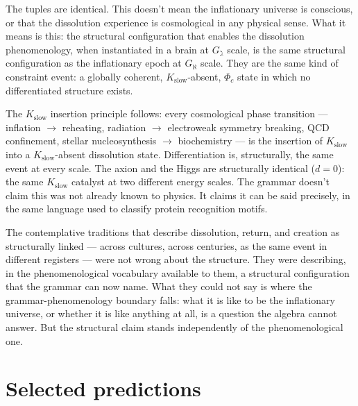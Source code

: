 \documentclass[12pt,a4paper]{article}
\newcommand{\Phic}{\Phi_c}
\begin{document}
The tuples are identical. This doesn't mean the inflationary universe
is conscious, or that the dissolution experience is cosmological in
any physical sense. What it means is this: the structural configuration
that enables the dissolution phenomenology, when instantiated in a
brain at $G_\gimel$ scale, is the same structural configuration as the
inflationary epoch at $G_\aleph$ scale. They are the same kind of
constraint event: a globally coherent, $K_\text{slow}$-absent,
$\Phic$ state in which no differentiated structure exists.

The $K_\text{slow}$ insertion principle follows: every cosmological
phase transition --- inflation $\to$ reheating, radiation $\to$
electroweak symmetry breaking, QCD confinement, stellar
nucleosynthesis $\to$ biochemistry --- is the insertion of $K_\text{slow}$
into a $K_\text{slow}$-absent dissolution state. Differentiation is,
structurally, the same event at every scale. The axion and the Higgs
are structurally identical ($d = 0$): the same $K_\text{slow}$ catalyst
at two different energy scales. The grammar doesn't claim this was
not already known to physics. It claims it can be said precisely,
in the same language used to classify protein recognition motifs.

The contemplative traditions that describe dissolution, return, and
creation as structurally linked --- across cultures, across centuries,
as the same event in different registers --- were not wrong about
the structure. They were describing, in the phenomenological vocabulary
available to them, a structural configuration that the grammar can
now name. What they could not say is where the grammar-phenomenology
boundary falls: what it is like to be the inflationary universe, or
whether it is like anything at all, is a question the algebra cannot
answer. But the structural claim stands independently of the
phenomenological one.

\section{Selected predictions}
\end{document}
